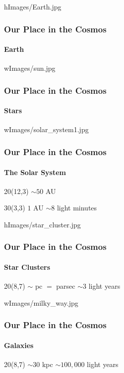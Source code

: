\newcommand{\secAtitle}{Our Place in the Cosmos}
\begin{frameb}{h}{Images/Earth.jpg}
	\frametitle{\secAtitle}
	\framesubtitle{Earth}
\end{frameb}

\begin{frameb}{w}{Images/sun.jpg}
	\frametitle{\secAtitle}
	\framesubtitle{Stars}
\end{frameb}

\begin{frameb}{w}{Images/solar_system1.jpg}
	\frametitle{\secAtitle}
	\framesubtitle{\hfill The Solar System}
	\begin{textblock}{20}(12,3)
	$\sim50$ AU
	\end{textblock}
	\begin{textblock}{30}(3,3)
	$1$ AU $\sim 8$ light minutes
	\end{textblock}
\end{frameb}


\begin{frameb}{h}{Images/star_cluster.jpg}
	\frametitle{\secAtitle}
	\framesubtitle{Star Clusters}
	\begin{textblock}{20}(8,7)
	$\sim$ pc $=$ parsec $\sim 3$ light years
	\end{textblock}
\end{frameb}

\begin{frameb}{w}{Images/milky_way.jpg}
	\frametitle{\secAtitle}
	\framesubtitle{Galaxies}
	\begin{textblock}{20}(8,7)
	$\sim 30$ kpc $\sim 100,000$ light years
	\end{textblock}
\end{frameb}

\plainframe{
	}


